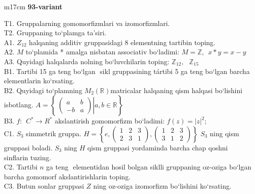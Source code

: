 \documentclass{article}
\begin{document}
\begin{tabular}{m{17cm}}
\textbf{93-variant}
\newline

T1. Gruppalarning gomomorfizmlari va izomorfizmlari. \\
T2. Gruppaning to`plamga ta'siri. \\
A1. \(Z_{12}\) halqaning additiv gruppasidagi 8 elementning tartibin toping. \\
A2. \(M\) to`plamida * amalga nisbatan associativ bo`ladimi: \(M\mathbb{= Z},\ \ x*y = x - y\) \\
A3. Quyidagi halqalarda nolning bo`luvchilarin toping: \(\mathbb{Z}_{12},\ \ \ \mathbb{Z}_{15}\) \\
B1. Tartibi 15 ga teng bo`lgan \(< a >\) sikl gruppasining tártibi 5 ga teng bo`lgan barcha elementlarin ko`rsating. \\
B2. Quyidagi to`plamning \(M_{2}(\mathbb{R})\)matricalar halqaning qism halqasi bo`lishini isbotlang. \(A = \left\{ \left. \ \begin{pmatrix}
a & b \\
 - b & a
\end{pmatrix} \right|a,b\mathbb{\in R} \right\}\) \\
B3. \(f:\ \ C^{*} \rightarrow R^{*}\) akslantirish gomomorfizm bo`ladimi: \(f(z) = |z|^{2};\) \\
C1. \(S_{3}\) simmetrik gruppa. \(H = \left\{ e,\begin{pmatrix}
1 & 2 & 3 \\
2 & 3 & 1
\end{pmatrix},\begin{pmatrix}
1 & 2 & 3 \\
3 & 1 & 2
\end{pmatrix} \right\}\) \(S_{3}\) ning qism gruppasi boladi. \(S_{3}\) ning \(H\) qism gruppasi yordaminda barcha chap qo\textquotesingle shni sinflarin tuzing. \\
C2. Tartibi \(n\) ga teng \(< a >\) elementidan hosil bo\textquotesingle lgan siklli gruppaning o\textquotesingle z-o\textquotesingle ziga bo`lgan barcha gomomorf akslantirishlarin toping. \\
C3. Butun sonlar gruppasi \(Z\) ning o\textquotesingle z-o\textquotesingle ziga izomorfizm bo`lishini ko`rsating. \\

\end{tabular}
\vspace{1cm}
\end{document}
